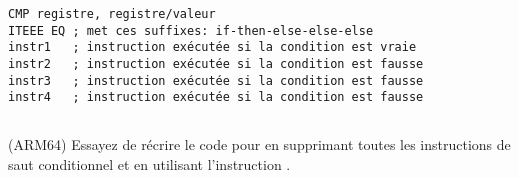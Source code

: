 \begin{lstlisting}[caption=ARM (\ThumbMode),style=customasmARM]
CMP registre, registre/valeur
ITEEE EQ ; met ces suffixes: if-then-else-else-else
instr1   ; instruction exécutée si la condition est vraie
instr2   ; instruction exécutée si la condition est fausse
instr3   ; instruction exécutée si la condition est fausse
instr4   ; instruction exécutée si la condition est fausse
\end{lstlisting}

\subsection{\Exercise}

(ARM64) Essayez de récrire le code pour  en supprimant toutes
les instructions de saut conditionnel et en utilisant l'instruction .

